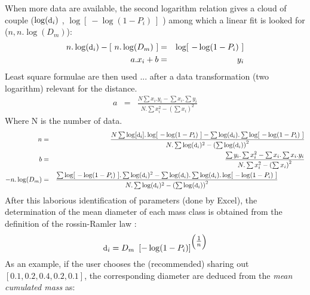When more data are available, the second logarithm relation gives a cloud of
couple ($\log(\mbox{\small d}_i)$ , $\log[~-\log(1-P_i)~]$ ) among which a
linear fit is looked for ($n, n.\log(D_m)$):
\begin{eqnarray}
  \displaystyle n . \log(\mbox{\small d}_i)- \left[~n.\log(D_m)~\right] &=& \log[~-\log(1-P_i)~] \label{Eqs_log_007}\\
  a.x_i + b &=& y_i \nonumber
\end{eqnarray}
Least square formulae are then used ... after a data transformation (two
logarithm) relevant for the distance.
\begin{eqnarray}
a &=& \frac{N \sum x_i.y_i - \sum x_i . \sum y_i}{N.\sum x_i^2 - \left( \sum x_i\right)^2} \label{Eqs_log_008}
\end{eqnarray}
Where N is the number of data.
\begin{eqnarray}
n &=& \frac{N \sum \log[\mbox{\small d}_i].\log[~-\log(1-P_i)~] - \sum \log(\mbox{\small d}_i) . \sum \log[~-\log(1-P_i)~]}{N.\sum \log(\mbox{\small d}_i)^2 - \left( \sum \log(\mbox{\small d}_i)\right)^2} \label{Eqs_log_009} \\
b &=& \frac{\sum y_i . \sum x_i^2 - \sum x_i . \sum x_i.y_i }{N.\sum x_i^2 - \left( \sum x_i\right)^2} \label{Eqs_log_010} \\ 
-n.\log(D_m) &=& \frac{\sum \log[~-\log(1-P_i)~] . \sum \log(\mbox{\small d}_i)^2 - \sum \log(\mbox{\small d}_i) . \sum \log(\mbox{\small d}_i).\log[~-\log(1-P_i)~] }{N.\sum \log(\mbox{\small d}_i)^2 - \left( \sum \log(\mbox{\small d}_i)\right)^2}\qquad \qquad\label{Eqs_log_011}
\end{eqnarray}
After this laborious identification of parameters (done by Excel), the
determination of the mean diameter of each mass class is obtained from the
definition of the rossin-Ramler law :
\begin{equation}
\displaystyle \mbox{\small d}_i = D_m ~ \left[-\log(1-P_i) \right]^{\left(\textstyle \frac{1}{n} \right)} \label{Eqs_log_012}
\end{equation} 
As an example, if the user chooses the (recommended) sharing out $\left[0.1 , 0.2 , 0.4 , 0.2, 0.1 \right]$, the corresponding diameter are deduced from the \textit{mean cumulated mass} as:
